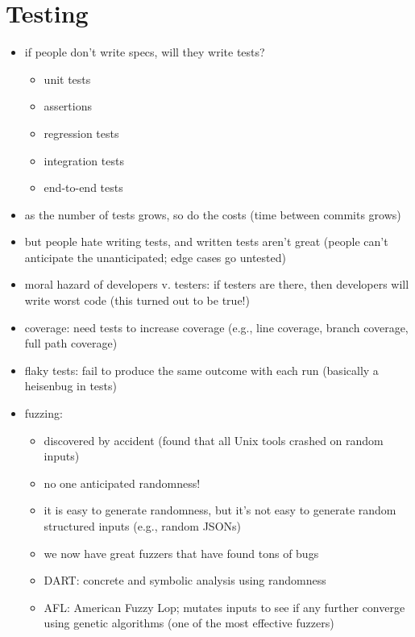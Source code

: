 \documentclass[twoside]{article}
\begin{document}
\section{Testing}
\begin{itemize}
	\item if people don't write specs, will they write tests?
	\begin{itemize}
		\item unit tests
		\item assertions
		\item regression tests
		\item integration tests
		\item end-to-end tests
	\end{itemize}
	\item as the number of tests grows, so do the costs (time between commits grows)
	\item but people hate writing tests, and written tests aren't great (people can't anticipate the unanticipated; edge cases go untested)
	\item moral hazard of developers v. testers: if testers are there, then developers will write worst code (this turned out to be true!)
	\item coverage: need tests to increase coverage (e.g., line coverage, branch coverage, full path coverage)
	\item flaky tests: fail to produce the same outcome with each run (basically a heisenbug in tests)
	\item fuzzing:
	\begin{itemize}
		\item discovered by accident (found that all Unix tools crashed on random inputs)
		\item no one anticipated randomness!
		\item it is easy to generate randomness, but it's not easy to generate random structured inputs (e.g., random JSONs)
		\item we now have great fuzzers that have found tons of bugs
		\item DART: concrete and symbolic analysis using randomness
		\item AFL: American Fuzzy Lop; mutates inputs to see if any further converge using genetic algorithms (one of the most effective fuzzers)
	\end{itemize}
\end{itemize}
\end{document}
